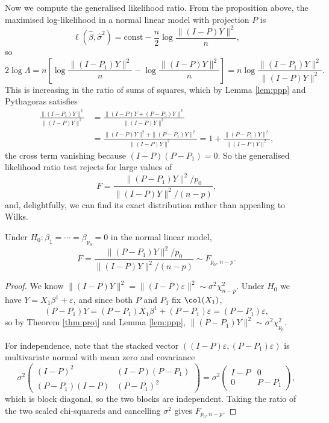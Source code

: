 Now we compute the generalised likelihood ratio. From the proposition above, the maximised log-likelihood in a normal linear model with projection $P$ is
$$
\ell(\hat\beta,\hat\sigma^2) = \text{const} - \frac{n}{2}\log\frac{\|(I-P)Y\|^2}{n},
$$
so
$$
2\log\Lambda = n\left[\log\frac{\|(I-P_1)Y\|^2}{n} - \log\frac{\|(I-P)Y\|^2}{n}\right] = n\log\frac{\|(I-P_1)Y\|^2}{\|(I-P)Y\|^2}.
$$
This is increasing in the ratio of sums of squares, which by Lemma \ref{lem:ppp} and Pythagoras satisfies
\begin{align*}
  \frac{\|(I-P_1)Y\|^2}{\|(I-P)Y\|^2} &= \frac{\|(I-P)Y + (P-P_1)Y\|^2}{\|(I-P)Y\|^2}\\
  &= \frac{\|(I-P)Y\|^2 + \|(P-P_1)Y\|^2}{\|(I-P)Y\|^2} = 1 + \frac{\|(P-P_1)Y\|^2}{\|(I-P)Y\|^2},
\end{align*}
the cross term vanishing because $(I-P)(P-P_1) = 0$. So the generalised likelihood ratio test rejects for large values of
$$
F = \frac{\|(P-P_1)Y\|^2/p_0}{\|(I-P)Y\|^2/(n-p)},
$$
and, delightfully, we can find its exact distribution rather than appealing to Wilks.

\begin{theorem}
  Under $H_0 : \beta_1 = \cdots = \beta_{p_0} = 0$ in the normal linear model,
  $$
  F = \frac{\|(P-P_1)Y\|^2/p_0}{\|(I-P)Y\|^2/(n-p)} \sim F_{p_0,\,n-p}.
  $$
\end{theorem}
\begin{proof}
  We know $\|(I-P)Y\|^2 = \|(I-P)\varepsilon\|^2\sim\sigma^2\chi^2_{n-p}$. Under $H_0$ we have $Y = X_1\beta^1 + \varepsilon$, and since both $P$ and $P_1$ fix $\col(X_1)$,
  $$
  (P-P_1)Y = (P-P_1)X_1\beta^1 + (P-P_1)\varepsilon = (P-P_1)\varepsilon,
  $$
  so by Theorem \ref{thm:proj} and Lemma \ref{lem:ppp}, $\|(P-P_1)Y\|^2\sim\sigma^2\chi^2_{p_0}$.

  For independence, note that the stacked vector $\left((I-P)\varepsilon, (P-P_1)\varepsilon\right)$ is multivariate normal with mean zero and covariance
  $$
  \sigma^2\begin{pmatrix}(I-P)^2 & (I-P)(P-P_1)\\(P-P_1)(I-P)&(P-P_1)^2\end{pmatrix} = \sigma^2\begin{pmatrix}I-P&0\\0&P-P_1\end{pmatrix},
  $$
  which is block diagonal, so the two blocks are independent. Taking the ratio of the two scaled chi-squareds and cancelling $\sigma^2$ gives $F_{p_0,n-p}$.
\end{proof}

